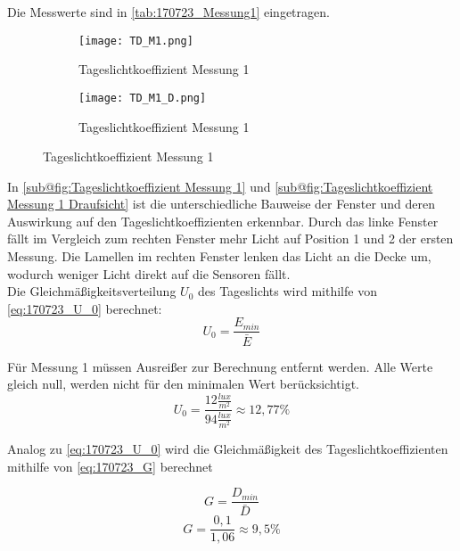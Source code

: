 Die Messwerte sind in \autoref{tab:170723_Messung1} eingetragen.
\begin{figure}[H]
\centering
\begin{subfigure}[c]{0.5\textwidth}
      \texttt{[image: TD\_M1.png]}
      \caption{Tageslichtkoeffizient Messung 1}
      \label{fig:Tageslichtkoeffizient Messung 1}
\end{subfigure}
\hfill
\begin{subfigure}[c]{0.45\textwidth}
      \texttt{[image: TD\_M1\_D.png]}
      \caption{Tageslichtkoeffizient Messung 1}
      \label{fig:Tageslichtkoeffizient Messung 1 Draufsicht}
\end{subfigure}
\label{fig:Messung 1 Tageslichtkoeffizient}
\end{figure}
In \autoref{sub@fig:Tageslichtkoeffizient Messung 1} und \autoref{sub@fig:Tageslichtkoeffizient Messung 1 Draufsicht} ist die unterschiedliche Bauweise der Fenster und deren Auswirkung auf den Tageslichtkoeffizienten erkennbar. Durch das linke Fenster fällt im Vergleich zum rechten Fenster mehr Licht auf Position 1 und 2 der ersten Messung. Die Lamellen im rechten Fenster lenken das Licht an die Decke um, wodurch weniger Licht direkt auf die Sensoren fällt.
\\Die Gleichmäßigkeitsverteilung $U_0$ des Tageslichts wird mithilfe von \autoref{eq:170723_U_0} berechnet:
\begin{equation}
  U_0 = \frac{E_{min}}{\bar E}
  \label{eq:170723_U_0}
\end{equation}

Für Messung 1 müssen Ausreißer zur Berechnung entfernt werden. Alle Werte gleich null, werden nicht für den minimalen Wert berücksichtigt.
$$U_0 = \frac{12\frac{lux}{m^2}}{94\frac{lux}{m^2}} \approx 12,77\%$$

Analog zu \autoref{eq:170723_U_0} wird die Gleichmäßigkeit des Tageslichtkoeffizienten mithilfe von \autoref{eq:170723_G} berechnet

\begin{equation}
  G = \frac{D_{min}}{\bar D}
  \label{eq:170723_G}
\end{equation}
$$G = \frac{0,1}{1,06} \approx 9,5\%$$
\newpage
